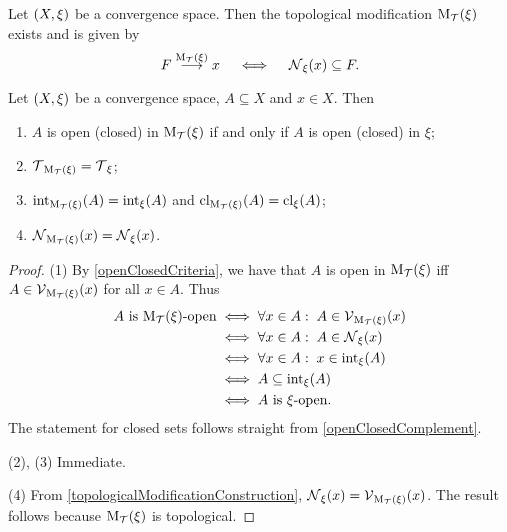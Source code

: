 \begin{proposition} \label{topologicalModificationConstruction}
Let $\left( X,\xi \right)$ be a convergence space. Then the topological modification $\operatorname{M_\mathcal{T}}(\xi)$ exists and is given by
\[ F \overset{\operatorname{M_\mathcal{T}}(\xi)}{\longrightarrow} x \quad\iff\quad \operatorname{\mathcal{N}}_\xi(x) \subseteq F. \]
\end{proposition}

\begin{proposition} \label{topologicalModificationPreservation}
Let $\left( X,\xi \right)$ be a convergence space, $A\subseteq X$ and $x\in X$. Then
\begin{enumerate}
\item $A$ is open (closed) in $\operatorname{M_\mathcal{T}}(\xi)$ \textup{if and only if} $A$ is open (closed) in $\xi$;
\item $\operatorname{\mathcal{T}}_{\operatorname{M_\mathcal{T}}(\xi)} = \operatorname{\mathcal{T}}_\xi$;
\item $\operatorname{int}_{\operatorname{M_\mathcal{T}}(\xi)}(A) = \operatorname{int}_{\xi}(A)$ and $\operatorname{cl}_{\operatorname{M_\mathcal{T}}(\xi)}(A) = \operatorname{cl}_{\xi}(A)$;
\item $\operatorname{\mathcal{N}}_{\operatorname{M_\mathcal{T}}(\xi)}(x) = \operatorname{\mathcal{N}}_\xi(x)$.
\end{enumerate}
\end{proposition}
\begin{proof}
(1) By \ref{openClosedCriteria}, we have that $A$ is open in $\operatorname{M_\mathcal{T}}(\xi)$ iff $A\in \operatorname{\mathcal{V}}_{\operatorname{M_\mathcal{T}}(\xi)}(x)$ for all $x\in A$. Thus
\begin{align*}
\text{$A$ is $\operatorname{M_\mathcal{T}}(\xi)$-open} &\iff \forall x\in A: \; A\in \operatorname{\mathcal{V}}_{\operatorname{M_\mathcal{T}}(\xi)}(x) \\
&\iff \forall x\in A: \; A\in \operatorname{\mathcal{N}}_\xi(x) \\
&\iff \forall x\in A: \; x\in \operatorname{int}_\xi(A) \\
&\iff A\subseteq \operatorname{int}_\xi(A) \\
&\iff \text{$A$ is $\xi$-open}.
\end{align*}
The statement for closed sets follows straight from \ref{openClosedComplement}.

(2), (3) Immediate.

(4) From \ref{topologicalModificationConstruction}, $\operatorname{\mathcal{N}}_\xi(x) = \operatorname{\mathcal{V}}_{\operatorname{M_\mathcal{T}}(\xi)}(x)$. The result follows because $\operatorname{M_\mathcal{T}}(\xi)$ is topological.
\end{proof}

